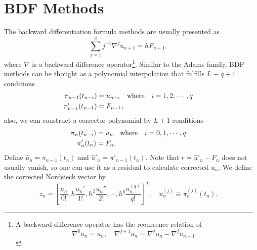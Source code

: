 \documentclass[11pt,a4paper]{article}
\begin{document}
\section{BDF Methods} \label{sec:bdf}
The backward differentiation formula methods are usually
presented as
\begin{equation} \label{eq:BDF_int}
  \sum_{j=1}^q j^{-1}\nabla^ju_{n+1} = hF_{n+1},
\end{equation}
where $\nabla$ is a backward difference operator\footnote{A backward
difference operator has the recurrence relation of
\[
  \nabla^0u_n = u_n,\quad \nabla^{j+1}u_n = \nabla^ju_n-\nabla^ju_{n-1}.
\]}.
Similar to the Adams family, BDF methods can be thought as a polynomial
interpolation that fulfills $L\equiv q+1$ conditions
\begin{align}
  \pi_{n-1}(t_{n-i})&=u_{n-i}\qq{where} i=1,2,\cdots,q \\
  \pi_{n-1}'(t_{n-1})&=F_{n-1},
\end{align}
also, we can construct a corrector polynomial by $L+1$ conditions
\begin{align}
  \pi_{n}(t_{n-i})&=u_{n}\qq{where} i=0,1,\cdots,q \\
  \pi'_{n}(t_{n})&=F_{n}.
\end{align}
Define $\hat{u}_n = \pi_{n-1}(t_n)$ and $\hat{u}'_n = \pi'_{n-1}(t_n)$. Note
that $r=\hat{u}'_n - F_n$ does not usually vanish, so one can use it as a
residual to calculate corrected $u_n$. We define the corrected Nordsieck vector
by
\begin{equation}
  z_n = \left[\frac{u_n}{0!}, h\frac{u_n'}{1!}, h^2\frac{u_n''}{2!},
  \cdots, h^q\frac{u_n^{(q)}}{q!}\right]^T,\quad u_n^{(j)}\equiv
  \pi_n^{(j)}(t_n).
\end{equation}
\end{document}
